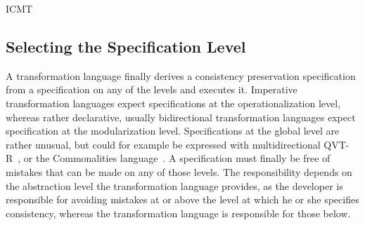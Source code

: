 \begin{copiedFrom}{ICMT}


\subsection{Selecting the Specification Level}

A transformation language finally derives a consistency preservation specification from a specification on any of the levels and executes it. %
Imperative transformation languages expect specifications at the operationalization level, whereas rather declarative, usually bidirectional transformation languages expect specification at the modularization level.
Specifications at the global level are rather unusual, but could for example be expressed with multidirectional QVT-R~\cite{macedo2014FrameworkMultiDirectional-BX}, or the Commonalities language~\cite{gleitze2017a}.
A specification must finally be free of mistakes that can be made on any of those levels. 
The responsibility depends on the abstraction level the transformation language provides, as the developer is responsible for avoiding mistakes at or above the level at which he or she specifies consistency, whereas the transformation language is responsible for those below.


\end{copiedFrom}
